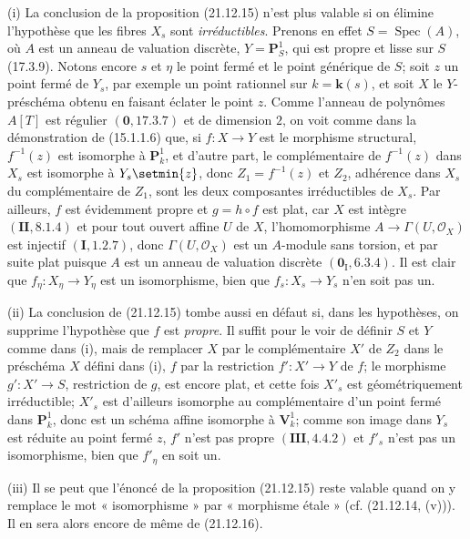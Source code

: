 \begin{remarks}[21.12.17]
\label{IV.21.12.17}
(i) La conclusion de la proposition (21.12.15) n'est plus valable si on élimine
l'hypothèse que les fibres $X_s$ sont \emph{irréductibles}. Prenons en effet
$S=\operatorname{Spec}(A)$, où $A$ est un anneau de valuation discrète,
$Y=\mathbf P^1_S$, qui est propre et lisse sur $S$ (17.3.9). Notons encore $s$ et
$\eta$ le point fermé et le point générique de $S$; soit $z$ un point fermé de $Y_s$,
par exemple un point rationnel sur $k=\boldsymbol{k}(s)$, et soit $X$ le $Y$-préschéma obtenu en
faisant éclater le point $z$. Comme l'anneau de polynômes $A[T]$ est régulier
$(\mathbf 0, 17.3.7)$ et de dimension $2$, on voit comme dans la démonstration de
(15.1.1.6) que, si $f:X\to Y$ est le morphisme structural, $f^{-1}(z)$ est isomorphe
à $\mathbf P^1_k$, et d'autre part, le complémentaire de $f^{-1}(z)$ dans $X_s$ est
isomorphe à $Y_s\setmin\{z\}$, donc $Z_1=f^{-1}(z)$ et $Z_2$, adhérence dans $X_s$ du
complémentaire de $Z_1$, sont les deux composantes irréductibles de $X_s$. Par
ailleurs, $f$ est évidemment propre et $g=h\circ f$ est plat, car $X$ est intègre
$(\mathbf{II}, 8.1.4)$ et pour tout ouvert affine $U$ de $X$, l'homomorphisme
$A\to\Gamma(U,\mathcal O_X)$ est injectif $(\mathbf I, 1.2.7)$, donc
$\Gamma(U,\mathcal O_X)$ est un $A$-module sans torsion, et par suite plat puisque $A$
est un anneau de valuation discrète $(\mathbf 0_{\mathrm I}, 6.3.4)$. Il est clair que
$f_\eta:X_\eta\to Y_\eta$ est un isomorphisme, bien que
$f_s:X_s\to Y_s$ n'en soit pas un.

(ii) La conclusion de (21.12.15) tombe aussi en défaut si, dans les hypothèses, on
supprime l'hypothèse que $f$ est \emph{propre}. Il suffit pour le voir de définir $S$ et
$Y$ comme dans (i), mais de remplacer $X$ par le complémentaire $X'$ de $Z_2$ dans le
préschéma $X$ défini dans (i), $f$ par la restriction $f':X'\to Y$ de $f$; le morphisme
$g':X'\to S$, restriction de $g$, est encore plat, et cette fois $X'_s$ est
géométriquement irréductible; $X'_s$ est d'ailleurs isomorphe au complémentaire d'un
point fermé dans $\mathbf P^1_k$, donc est un schéma affine isomorphe à $\mathbf V^1_k$;
comme son image dans $Y_s$ est réduite au point fermé $z$, $f'$ n'est pas propre
$(\mathbf{III}, 4.4.2)$ et $f'_s$ n'est pas un isomorphisme, bien que $f'_\eta$ en soit
un.

(iii) Il se peut que l'énoncé de la proposition (21.12.15) reste valable quand on y
remplace le mot « isomorphisme » par « morphisme étale » (cf. (21.12.14, (v))). Il en
sera alors encore de même de (21.12.16).
\end{remarks}
